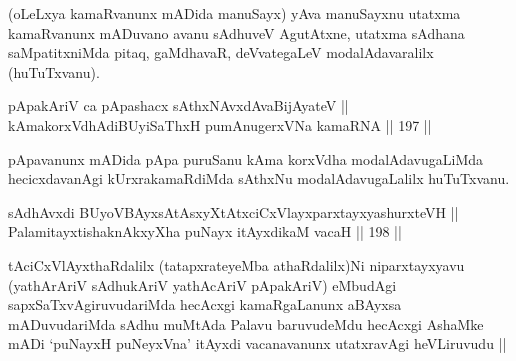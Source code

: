 \begin{artha}
(oLeLxya kamaRvanunx mADida manuSayx) yAva manuSayxnu utatxma
kamaRvanunx mADuvano avanu sAdhuveV AgutAtxne, utatxma sAdhana
saMpatitxniMda pitaq, gaMdhavaR, deVvategaLeV modalAdavaralilx
(huTuTxvanu).
\end{artha}

\begin{shl}
pApakAriV ca pApashacx sAthxNAvxdAvaBijAyateV || \\
kAmakorxVdhAdiBUyiSaThxH pumAnugerxVNa kamaRNA \hfill || 197 ||  
\end{shl}

\begin{artha}
pApavanunx mADida pApa puruSanu kAma korxVdha modalAdavugaLiMda
hecicxdavanAgi kUrxrakamaRdiMda sAthxNu modalAdavugaLalilx huTuTxvanu.
\end{artha}



\begin{shl}
sAdhAvxdi BUyoVBAyxsAtAsxyXtAtxciCxVlayxparxtayxyashurxteVH || \\
PalamitayxtishaknAkxyX\s \s ha puNayx itAyxdikaM vacaH \hfill || 198 ||  
\end{shl}

\begin{artha}
tAciCxVlAyxthaRdalilx (tatapxrateyeMba athaRdalilx)Ni niparxtayxyavu
(yathArAriV sAdhukAriV yathAcAriV pApakAriV) eMbudAgi
sapxSaTxvAgiruvudariMda hecAcxgi kamaRgaLanunx aBAyxsa mADuvudariMda
sAdhu muMtAda Palavu baruvudeMdu hecAcxgi AshaMke mADi `puNayxH
puNeyxVna' itAyxdi vacanavanunx utatxravAgi heVLiruvudu ||
\end{artha}


